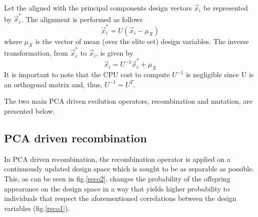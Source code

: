 Let the aligned with the principal components design vectors \(\vec{x}_i\) be represented by \(\vec{x}^*_i\). The alignment is performed as follows
\begin{equation} 
   \vec{x}^*_i=U(\vec{x}_i-\mu_{X})
   \label{align} %
\end{equation}
where $\mu_{X}$ is the vector of mean (over the elite set) design variables.
The inverse transformation, from $\vec{x}^*_i$ to $\vec{x}_i$, is given by
\begin{equation} 
   \vec{x}_i=U^{-1}\vec{x}^*_i+\mu_{X}
	\label{re-align}
\end{equation}
It is important to note that the CPU cost to compute \(U^{-1}\) is negligible since U is an orthogonal matrix and, thus, \(U^{-1} = U^T\). 

The two main PCA driven evolution operators, recombination and mutation, are presented below.  

\paragraph{}
\subsection{PCA driven recombination}
In PCA driven recombination, the recombination operator is applied on a continuously updated design space which is sought to be as separable as possible. This, as can be seen in fig.\ref{reco2}, changes the probability of the offspring appearance on the design space in a way that  
yields higher probability to individuals that respect the aforementioned correlations between the design variables (fig.\ref{reco1}). 

